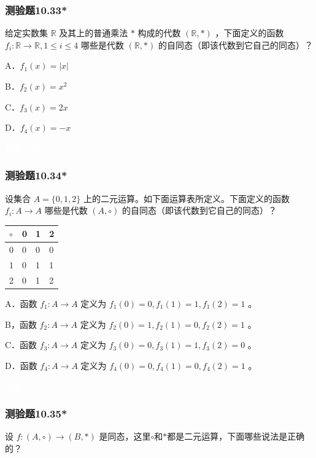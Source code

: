 \documentclass[UTF8, heading=true]{ctexart}
\begin{document}
\subsubsection{测验题10.33*}

给定实数集 $\mathbb{R}$ 及其上的普通乘法 $*$ 构成的代数 $(\mathbb{R}, *)$ ，下面定义的函数 $f_i: \mathbb{R} \rightarrow \mathbb{R}, 1 \leq i \leq 4$ 哪些是代数 $(\mathbb{R}, *)$ 的自同态（即该代数到它自己的同态）？

A．$ f_1(x)=|x|$

B．$f_2(x)=x^2$

C．$f_3(x)=2 x$

D．$f_4(x)=-x$

\textcolor{white}{答案：AB}

\subsubsection{测验题10.34*}

设集合 $A=\{0,1,2\}$ 上的二元运算。如下面运算表所定义。下面定义的函数 $f_i: A \rightarrow A$ 哪些是代数 $(A, \circ)$ 的自同态（即该代数到它自己的同态）？
\begin{table}[H]
  \renewcommand{\arraystretch}{1.5}
  \centering
\begin{tabular}{l|lll}
\hline$\circ$ & 0 & 1 & 2 \\
\hline 0 & 0 & 0 & 0 \\
1 & 0 & 1 & 1 \\
2 & 0 & 1 & 2 \\
\hline
\end{tabular}
\end{table}

A．函数 $f_1: A \rightarrow A$ 定义为 $f_1(0)=0, f_1(1)=1, f_1(2)=1$ 。

B，函数 $f_2: A \rightarrow A$ 定义为 $f_2(0)=1, f_2(1)=0, f_2(2)=1$ 。

C．函数 $f_3: A \rightarrow A$ 定义为 $f_3(0)=0, f_3(1)=1, f_3(2)=0$ 。

D．函数 $f_4: A \rightarrow A$ 定义为 $f_4(0)=0, f_4(1)=0, f_4(2)=1$ 。

\textcolor{white}{答案：AD}

\subsubsection{测验题10.35*}

设 $f:(A, \circ) \rightarrow(B, *)$ 是同态，这里$\circ$和$*$都是二元运算，下面哪些说法是正确的？
\end{document}
